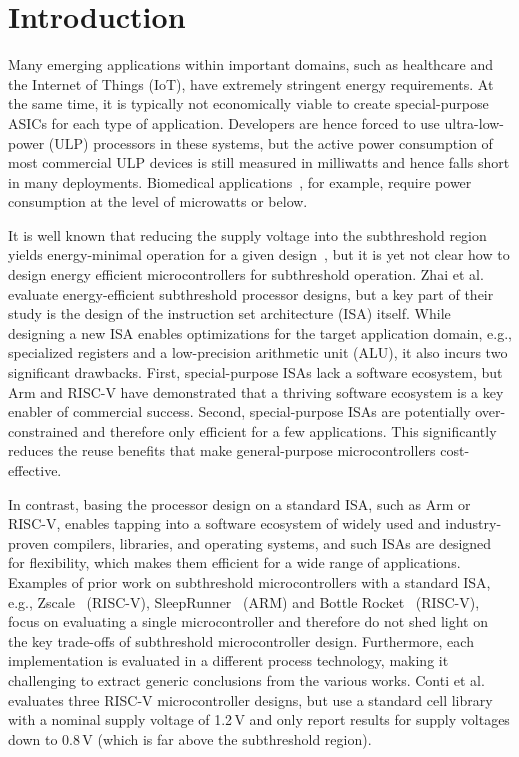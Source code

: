 \section{Introduction}

Many emerging applications within important domains, such as healthcare and the Internet of Things (IoT), have extremely stringent energy requirements.
At the same time, it is typically not economically viable to create special-purpose ASICs for each type of application.
Developers are hence forced to use ultra-low-power (ULP) processors in these systems, but the active power consumption of most commercial ULP devices is still measured in milliwatts and hence falls short in many deployments. Biomedical applications~\cite{chen_injectable_2015}, for example, require power consumption at the level of microwatts or below.

It is well known that reducing the supply voltage into the subthreshold region yields energy-minimal operation for a given design~\cite{weak-inversion:JSSC1997, Tsiv}, but it is yet not clear how to design energy efficient microcontrollers for subthreshold operation.
Zhai et al.~\cite{subVt-mcu:TVLSI2009} evaluate energy-efficient subthreshold processor designs, but a key part of their study is the design of the instruction set architecture (ISA) itself.
While designing a new ISA enables optimizations for the target application domain, e.g., specialized registers and a low-precision arithmetic unit (ALU), it also incurs two significant drawbacks.
First, special-purpose ISAs lack a software ecosystem, but Arm and RISC-V have demonstrated that a thriving software ecosystem is a key enabler of commercial success. 
Second, special-purpose ISAs are potentially over-constrained and therefore only efficient for a few applications. 
This significantly reduces the reuse benefits that make general-purpose microcontrollers cost-effective.

In contrast, basing the processor design on a standard ISA, such as Arm or RISC-V, enables tapping into a software ecosystem of widely used and industry-proven compilers, libraries, and operating systems, and such ISAs are designed for flexibility, which makes them efficient for a wide range of applications.
Examples of prior work on subthreshold microcontrollers with a standard ISA, e.g., Zscale~\cite{zscale:ESSCIRC2018} (RISC-V), SleepRunner~\cite{sleeprunner:JSSC2021} (ARM) and Bottle Rocket~\cite{10409181} (RISC-V), focus on evaluating a single microcontroller and therefore do not shed light on the key trade-offs of subthreshold microcontroller design.
Furthermore, each implementation is evaluated in a different process technology, making it challenging to extract generic conclusions from the various works.
Conti et al.~\cite{schiavone:PATMOS2017} evaluates three RISC-V microcontroller designs, but use a standard cell library with a nominal supply voltage of 1.2\,V and only report results for supply voltages down to 0.8\,V (which is far above the subthreshold region).


